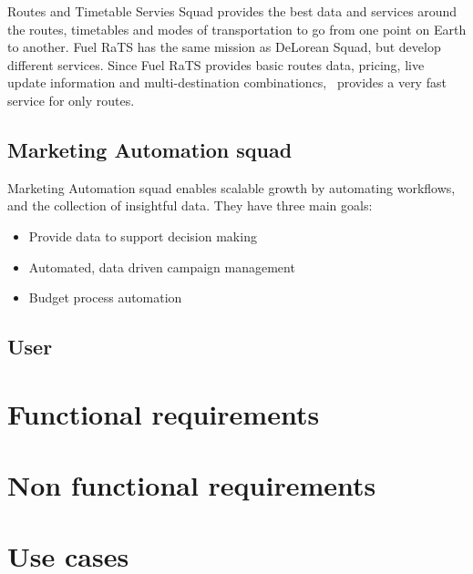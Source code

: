 Routes and Timetable Servies Squad provides the best data and services around the routes, timetables and modes of transportation to go from one point on Earth to another. Fuel RaTS has the same mission as DeLorean Squad, but develop different services. Since Fuel RaTS provides basic routes data, pricing, live update information and multi-destination combinationcs, \squad\ provides a very fast service for only routes.

\subsection{Marketing Automation squad} \label{mas}

Marketing Automation squad enables scalable growth by automating workflows, and the collection of insightful data. They have three main goals:

\begin{itemize}
  \item Provide data to support decision making
  \item Automated, data driven campaign management
  \item Budget process automation
\end{itemize}



\subsection{User}

\section{Functional requirements}

\section{Non functional requirements}

\section{Use cases}

